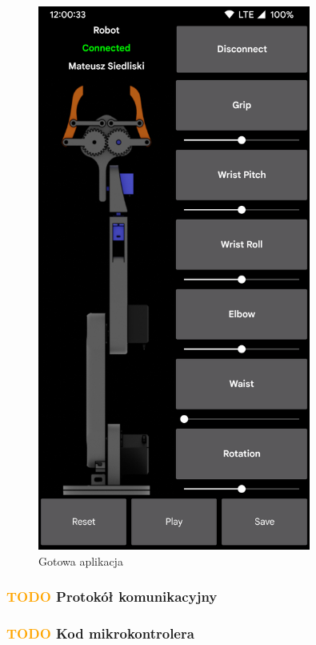 \documentclass[11pt,titlepage,a4paper]{article}
\begin{document}
\begin{figure}[p]
    \begin{center}
        \includegraphics[width=0.8\textwidth]{img/app.png}
    \end{center}
    \caption{Gotowa aplikacja}
    \label{FinalApp}
\end{figure}

\subsubsection{\textcolor{orange}{TODO} Protokół komunikacyjny}
\subsubsection{\textcolor{orange}{TODO} Kod mikrokontrolera}
\end{document}
